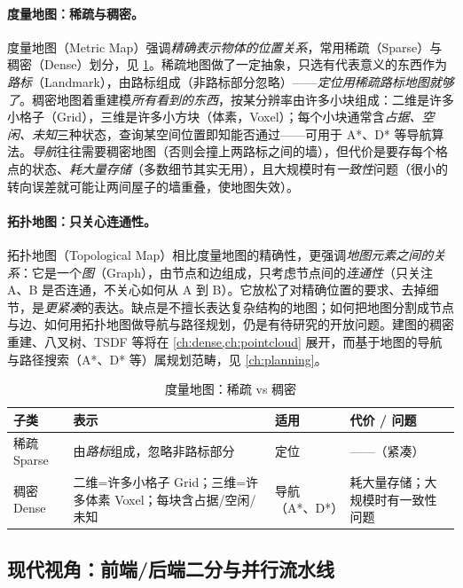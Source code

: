 \paragraph{度量地图：稀疏与稠密。}
度量地图（Metric Map）强调\emph{精确表示物体的位置关系}，常用稀疏（Sparse）与稠密（Dense）划分，见 \cref{tab:intro-maps}。稀疏地图做了一定抽象，只选有代表意义的东西作为\emph{路标}（Landmark），由路标组成（非路标部分忽略）——\emph{定位用稀疏路标地图就够了}。稠密地图着重建模\emph{所有看到的东西}，按某分辨率由许多小块组成：二维是许多小格子（Grid），三维是许多小方块（体素，Voxel）；每个小块通常含\emph{占据、空闲、未知}三种状态，查询某空间位置即知能否通过——可用于 A*、D* 等导航算法。\emph{导航}往往需要稠密地图（否则会撞上两路标之间的墙），但代价是要存每个格点的状态、\emph{耗大量存储}（多数细节其实无用），且大规模时有\emph{一致性}问题（很小的转向误差就可能让两间屋子的墙重叠，使地图失效）。

\paragraph{拓扑地图：只关心连通性。}
拓扑地图（Topological Map）相比度量地图的精确性，更强调\emph{地图元素之间的关系}：它是一个\emph{图}（Graph），由节点和边组成，只考虑节点间的\emph{连通性}（只关注 A、B 是否连通，不关心如何从 A 到 B）。它放松了对精确位置的要求、去掉细节，是\emph{更紧凑}的表达。缺点是不擅长表达复杂结构的地图；如何把地图分割成节点与边、如何用拓扑地图做导航与路径规划，仍是有待研究的开放问题。建图的稠密重建、八叉树、TSDF 等将在 \cref{ch:dense,ch:pointcloud} 展开，而基于地图的导航与路径搜索（A*、D* 等）属规划范畴，见 \cref{ch:planning}。

\begin{table}[H]\centering\small
\caption{度量地图：稀疏 vs 稠密}
\label{tab:intro-maps}
\begin{tabular}{p{} p{} p{} p{}}
\toprule
子类 & 表示 & 适用 & 代价 / 问题 \\
\midrule
稀疏 Sparse & 由\emph{路标}组成，忽略非路标部分 & 定位 & ——（紧凑） \\
稠密 Dense & 二维=许多小格子 Grid；三维=许多体素 Voxel；每块含占据/空闲/未知 & 导航（A*、D*） & 耗大量存储；大规模时有一致性问题 \\
\bottomrule
\end{tabular}
\end{table}

\subsection{现代视角：前端/后端二分与并行流水线}
\label{sec:intro-frontback}
